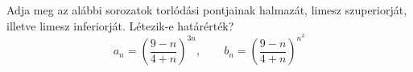 \documentclass[11pt]{scrartcl}
\begin{document}
Adja meg az alábbi sorozatok torlódási pontjainak halmazát, limesz
szuperiorját, illetve limesz inferiorját. Létezik-e határérték?
\[
	a_n = \left(\frac{9 - n}{4 + n}\right)^{3n}, \qquad
	b_n = \left(\frac{9 - n}{4 + n}\right)^{n^3}
\]
\end{document}
